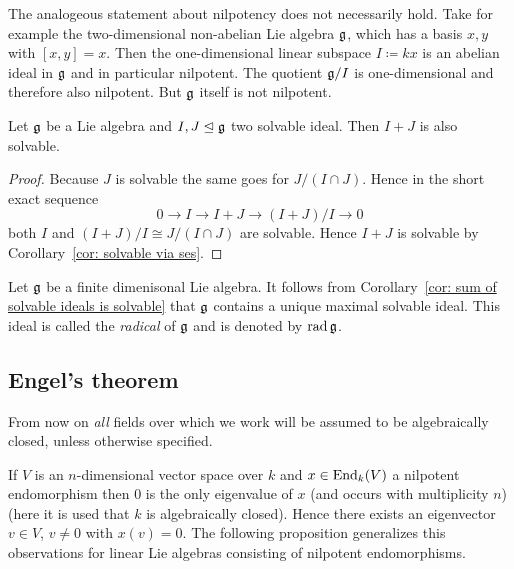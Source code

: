 \begin{rem}
 The analogeous statement about nilpotency does not necessarily hold. Take for example the two-dimensional non-abelian Lie algebra $\mathfrak{g}$, which has a basis $x,y$ with $[x,y] = x$. Then the one-dimensional linear subspace $I \coloneqq kx$ is an abelian ideal in $\mathfrak{g}$ and in particular nilpotent. The quotient $\mathfrak{g}/I$ is one-dimensional and therefore also nilpotent. But $\mathfrak{g}$ itself is not nilpotent.
\end{rem}


\begin{cor}\label{cor: sum of solvable ideals is solvable}
 Let $\mathfrak{g}$ be a Lie algebra and $I, J \trianglelefteq \mathfrak{g}$ two solvable ideal. Then $I + J$ is also solvable.
\end{cor}
\begin{proof}
 Because $J$ is solvable the same goes for $J/(I \cap J)$. Hence in the short exact sequence
 \[
  0 \to I \to I+J \to (I+J)/I \to 0
 \]
 both $I$ and $(I+J)/I \cong J/(I \cap J)$ are solvable. Hence $I+J$ is solvable by Corollary~\ref{cor: solvable via ses}.
\end{proof}


\begin{defi}
 Let $\mathfrak{g}$ be a finite dimenisonal Lie algebra. It follows from Corollary~\ref{cor: sum of solvable ideals is solvable} that $\mathfrak{g}$ contains a unique maximal solvable ideal. This ideal is called the \emph{radical} of $\mathfrak{g}$ and is denoted by $\operatorname{rad} \mathfrak{g}$.
\end{defi}






\subsection{Engel’s theorem}


From now on \emph{all} fields over which we work will be assumed to be algebraically closed, unless otherwise specified.


If $V$ is an $n$-dimensional vector space over $k$ and $x \in \operatorname{End}_k(V)$ a nilpotent endomorphism then $0$ is the only eigenvalue of $x$ (and occurs with multiplicity $n$) (here it is used that $k$ is algebraically closed). Hence there exists an eigenvector $v \in V$, $v \neq 0$ with $x(v) = 0$. The following proposition generalizes this observations for linear Lie algebras consisting of nilpotent endomorphisms.


